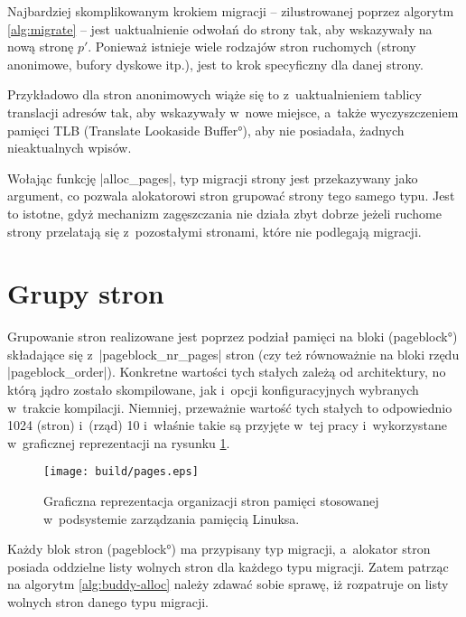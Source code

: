 Najbardziej skomplikowanym krokiem migracji -- zilustrowanej poprzez
algorytm \ref{alg:migrate} -- jest uaktualnienie odwołań do strony
tak, aby wskazywały na nową stronę $p'$.  Ponieważ istnieje wiele
rodzajów stron ruchomych (strony anonimowe, bufory dyskowe itp.), jest
to krok specyficzny dla danej strony.

Przykładowo dla stron anonimowych wiąże się to z~uaktualnieniem
tablicy translacji adresów tak, aby wskazywały w~nowe miejsce, a~także
wyczyszczeniem pamięci TLB (\ang{Translate Lookaside Buffer}), aby nie
posiadała, żadnych nieaktualnych wpisów.

Wołając funkcję \code|alloc_pages|, typ migracji strony jest
przekazywany jako argument, co pozwala alokatorowi stron grupować
strony tego samego typu.  Jest to istotne, gdyż mechanizm zagęszczania
nie działa zbyt dobrze jeżeli ruchome strony przelatają się
z~pozostałymi stronami, które nie podlegają migracji.


\section{Grupy stron}

Grupowanie stron realizowane jest poprzez podział pamięci na bloki
(\ang{pageblock}) składające się z~\code|pageblock_nr_pages| stron
(czy też równoważnie na bloki rzędu \code|pageblock_order|).
Konkretne wartości tych stałych zależą od architektury, no którą jądro
zostało skompilowane, jak i~opcji konfiguracyjnych wybranych w~trakcie
kompilacji.  Niemniej, przeważnie wartość tych stałych to odpowiednio
1024 (stron) i~(rząd) 10 i~właśnie takie są przyjęte w~tej pracy
i~wykorzystane w~graficznej reprezentacji na rysunku \ref{fig:pages}.

\begin{figure}[tbp]
\begin{center}
\texttt{[image: build/pages.eps]}
\end{center}
\caption[Organizacja pamięci w~Linuksie.]{Graficzna reprezentacja
  organizacji stron pamięci stosowanej w~podsystemie zarządzania
  pamięcią Linuksa.}
\label{fig:pages}
\end{figure}

Każdy blok stron (\ang{pageblock}) ma przypisany typ migracji,
a~alokator stron posiada oddzielne listy wolnych stron dla każdego
typu migracji.  Zatem patrząc na algorytm \ref{alg:buddy-alloc} należy
zdawać sobie sprawę, iż rozpatruje on listy wolnych stron danego typu
migracji.

